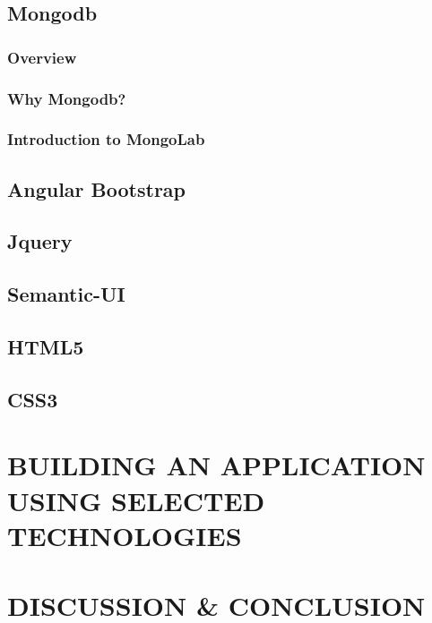 \documentclass[14pt,a4paper]{extreport}
\begin{document}
	\section{Mongodb}
		\subsection{Overview}
		\subsection{Why Mongodb?}
		\subsection{Introduction to MongoLab}
	\section{Angular Bootstrap}
	\section{Jquery}
	\section{Semantic-UI}
	\section{HTML5}
	\section{CSS3}
\chapter{BUILDING AN APPLICATION USING SELECTED TECHNOLOGIES}
	

	

\chapter{DISCUSSION \& CONCLUSION}
\end{document}
